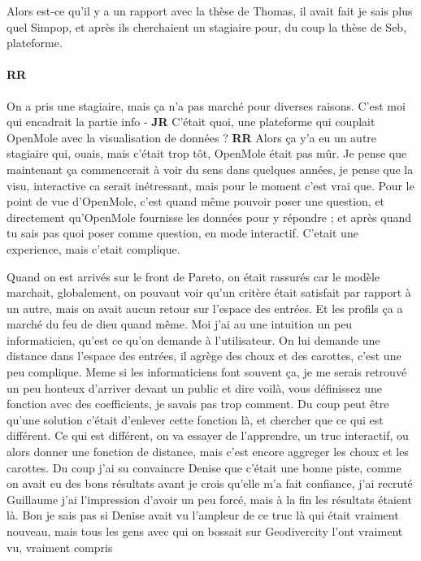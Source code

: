 \documentclass[12pt]{article}
\begin{document}
Alors est-ce qu'il y a un rapport avec la thèse de Thomas, il avait fait je sais plus quel Simpop, et après ils cherchaient un stagiaire pour, du coup la thèse de Seb, plateforme.

\paragraph{RR}

On a pris une stagiaire, mais ça n'a pas marché pour diverses raisons. C'est moi qui encadrait la partie info - \textbf{JR} C'était quoi, une plateforme qui couplait OpenMole avec la visualisation de données ? \textbf{RR} Alors ça y'a eu un autre stagiaire qui, ouais, mais c'était trop tôt, OpenMole était pas mûr. Je pense que maintenant ça commencerait à voir du sens dans quelques années, je pense que la visu, interactive ca serait inétressant, mais pour le moment c'est vrai que. Pour le point de vue d'OpenMole, c'est quand même pouvoir poser une question, et directement qu'OpenMole fournisse les données pour y répondre ; et après quand tu sais pas quoi poser comme question, en mode interactif. C'etait une experience, mais c'etait complique. 


Quand on est arrivés sur le front de Pareto, on était rassurés car le modèle marchait, globalement, on pouvaut voir qu'un critère était satisfait par rapport à un autre, mais on avait aucun retour sur l'espace des entrées. Et les profils ça a marché du feu de dieu quand même. Moi j'ai au une intuition un peu informaticien, qu'est ce qu'on demande à l'utilisateur. On lui demande une distance dans l'espace des entrées, il agrège des choux et des carottes, c'est une peu complique. Meme si les informaticiens font souvent ça, je me serais retrouvé un peu honteux d'arriver devant un public et dire voilà, vous définissez une fonction avec des coefficients, je savais pas trop comment. Du coup peut être qu'une solution c'était d'enlever cette fonction là, et chercher que ce qui est différent. Ce qui est différent, on va essayer de l'apprendre, un truc interactif, ou alors donner une fonction de distance, mais c'est encore aggreger les choux et les carottes. Du coup j'ai su convaincre Denise que c'était une bonne piste, comme on avait eu des bons résultats avant je crois qu'elle m'a fait confiance,%
j'ai recruté Guillaume j'ai l'impression d'avoir un peu forcé, mais à la fin les résultats étaient là. Bon je sais pas si Denise avait vu l'ampleur de ce truc là qui était vraiment nouveau, mais tous les gens avec qui on bossait sur Geodivercity l'ont vraiment vu, vraiment compris
\end{document}
